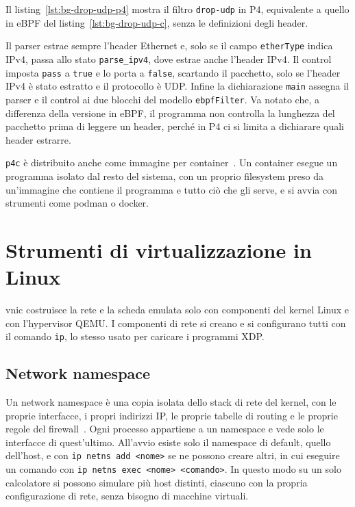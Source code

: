 Il listing~\ref{lst:bg-drop-udp-p4} mostra il filtro \texttt{drop-udp} in P4, equivalente a quello in eBPF del listing~\ref{lst:bg-drop-udp-c}, senza le definizioni degli header.

\noindent\begin{minipage}{\linewidth}

\end{minipage}

Il parser estrae sempre l'header Ethernet e, solo se il campo \texttt{etherType} indica IPv4, passa allo stato \texttt{parse\_ipv4}, dove estrae anche l'header IPv4. Il control imposta \texttt{pass} a \texttt{true} e lo porta a \texttt{false}, scartando il pacchetto, solo se l'header IPv4 è stato estratto e il protocollo è UDP. Infine la dichiarazione \texttt{main} assegna il parser e il control ai due blocchi del modello \texttt{ebpfFilter}. Va notato che, a differenza della versione in eBPF, il programma non controlla la lunghezza del pacchetto prima di leggere un header, perché in P4 ci si limita a dichiarare quali header estrarre.

\texttt{p4c} è distribuito anche come immagine per container~\cite{p4c-docker}. Un container esegue un programma isolato dal resto del sistema, con un proprio filesystem preso da un'immagine che contiene il programma e tutto ciò che gli serve, e si avvia con strumenti come podman o docker.

\section{Strumenti di virtualizzazione in Linux}\label{sec:virt-rete}

vnic costruisce la rete e la scheda emulata solo con componenti del kernel Linux e con l'hypervisor QEMU. I componenti di rete si creano e si configurano tutti con il comando \texttt{ip}, lo stesso usato per caricare i programmi XDP.

\subsection{Network namespace}

Un network namespace è una copia isolata dello stack di rete del kernel, con le proprie interfacce, i propri indirizzi IP, le proprie tabelle di routing e le proprie regole del firewall~\cite{man-ipnetns}. Ogni processo appartiene a un namespace e vede solo le interfacce di quest'ultimo. All'avvio esiste solo il namespace di default, quello dell'host, e con \texttt{ip netns add <nome>} se ne possono creare altri, in cui eseguire un comando con \texttt{ip netns exec <nome> <comando>}. In questo modo su un solo calcolatore si possono simulare più host distinti, ciascuno con la propria configurazione di rete, senza bisogno di macchine virtuali.

